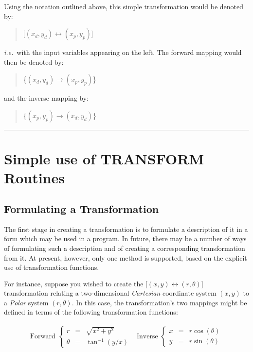 \documentclass[twoside,11pt]{article}
\newcommand{\xlabel}[1]{}
\renewcommand{\_}{\texttt{\symbol{95}}}
\newcommand{\exampledone}[0]{\begin{center} \rule{6em}{0.2mm} \end{center}}
\begin{document}
Using the notation outlined above, this simple transformation would be
denoted by:
\begin{quote}
\begin{center}
\mbox{[$(x_d,y_d) \leftrightarrow (x_p,y_p)$]}
\end{center}
\end{quote}
\emph{i.e.}\ with the input variables appearing on the left.
The forward mapping would then be denoted by:
\begin{quote}
\begin{center}
\mbox{\{$(x_d,y_d) \rightarrow (x_p,y_p)$\}}
\end{center}
\end{quote}
and the inverse mapping by:
\begin{quote}
\begin{center}
\mbox{\{$(x_p,y_p) \rightarrow (x_d,y_d)$\}}
\end{center}
\end{quote}
\exampledone


\section{\xlabel{simple_use_of_transform_routines}Simple use of TRANSFORM Routines}


\subsection{\xlabel{formulating_a_transformation}Formulating a Transformation}

The first stage in creating a transformation is to formulate a description
of it in a form which may be used in a program.
In future, there may be a number of ways of formulating such a description
and of creating a corresponding transformation from it.
At present, however, only one method is supported, based on the explicit use
of transformation functions.

For instance, suppose you wished to create the \mbox{[$(x,y) \leftrightarrow
(r,\theta)$]} transformation relating a two-dimensional {\em Cartesian}
coordinate system \mbox{$(x,y)$} to a \emph{Polar} system
\mbox{$(r,\theta)$}.
In this case, the transformation's two mappings might be defined in terms of
the following transformation functions:

\begin{equation}
\begin{array}{cc}
\mbox{Forward } \left\{
\begin{array}{lll}
r & = & \sqrt{x^2+y^2} \\
\theta & = & \tan^{-1} \left( {y/x} \right)
\end{array}
\right.
&
\mbox{Inverse } \left\{
\begin{array}{lll}
x & = & r \cos( \theta ) \\
y & = & r \sin( \theta )
\end{array}
\right.
\end{array}
\label{equation:polar}
\end{equation}
\end{document}
